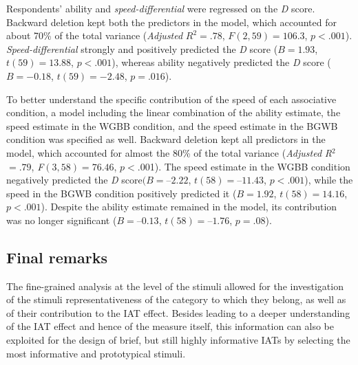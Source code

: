 \documentclass[12pt]{book}
\begin{document}
Respondents' ability and \emph{speed-differential} were regressed on the \emph{D} score.
 Backward deletion kept both the predictors in the model, which accounted for about 70\% of the total variance (\emph{Adjusted} $R^2 = .78$, $F(2, 59) = 106.3$, $p < .001$). \emph{Speed-differential} strongly and positively predicted the \emph{D} score ($B = 1.93$, $t(59) = 13.88$, $p < .001$), whereas ability negatively predicted the \emph{D} score ($B = -0.18$, $t(59) = -2.48$, $p = .016$).

To better understand the specific contribution of the speed of each associative condition, a model including the linear combination of the ability estimate, the speed estimate in the WGBB condition, and the speed estimate in the BGWB condition was specified as well. 
Backward deletion kept all predictors in the model, which accounted for almost the 80\% of the total variance (\emph{Adjusted} \emph{R}$^2$ $= .79$, \emph{F}$(3, 58) = 76.46$, $p < .00$1). 
The speed estimate in the WGBB condition negatively predicted the \emph{D} score$ (B = –2.22$, $t(58) = –11.43$, $p < .001$), while the speed in the BGWB condition positively predicted it ($B = 1.92$, $t(58) = 14.16$, $p < .001$). Despite the ability estimate remained in the model, its contribution was no longer significant ($B = –0.13$, $t(58) =–1.76$, $p = .08$). 


\subsection{Final remarks}

The fine-grained analysis at the level of the stimuli allowed for the investigation of the stimuli representativeness of the category to which they belong, as well as of their contribution to the IAT effect. 
Besides leading to a deeper understanding of the IAT effect and hence of the measure itself, this information can also be exploited for the design of brief, but still highly informative IATs by selecting the most informative and prototypical stimuli.
\end{document}
